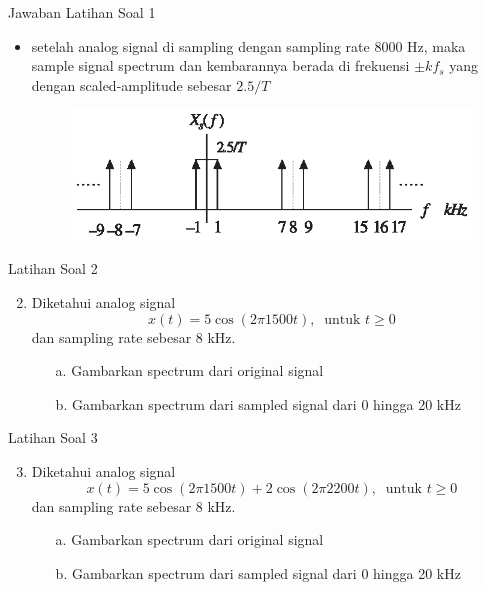 \documentclass[pdflatex,compress,mathserif]{beamer}
\begin{document}
\begin{frame}{Jawaban Latihan Soal 1}
    \begin{itemize}
        \item setelah analog signal di sampling dengan sampling rate 8000 Hz, maka sample signal spectrum dan kembarannya berada di frekuensi $\pm kf_s$ yang dengan scaled-amplitude sebesar $2.5/T$
        \begin{figure}
            \includegraphics[width=\linewidth]{./img/img13}
        \end{figure}
    \end{itemize}
\end{frame}

\begin{frame}{Latihan Soal 2}
    \begin{enumerate}
        \setcounter{enumi}{1}
        \item Diketahui analog signal
        \begin{equation*}
            x(t) = 5 \cos (2 \pi 1500 t),~\text{ untuk } t \geq 0
        \end{equation*}
        dan sampling rate sebesar 8 kHz.
        \begin{enumerate}
            \item[a.] Gambarkan spectrum dari original signal
            \item[b.] Gambarkan spectrum dari sampled signal dari 0 hingga 20 kHz
        \end{enumerate}
    \end{enumerate}
\end{frame}

\begin{frame}{Latihan Soal 3}
    \begin{enumerate}
        \setcounter{enumi}{2}
        \item Diketahui analog signal
        \begin{equation*}
            x(t) = 5 \cos (2 \pi 1500 t) + 2 \cos (2 \pi 2200 t),~\text{ untuk } t \geq 0
        \end{equation*}
        dan sampling rate sebesar 8 kHz.
        \begin{enumerate}
            \item[a.] Gambarkan spectrum dari original signal
            \item[b.] Gambarkan spectrum dari sampled signal dari 0 hingga 20 kHz
        \end{enumerate}
    \end{enumerate}
\end{frame}
\end{document}
